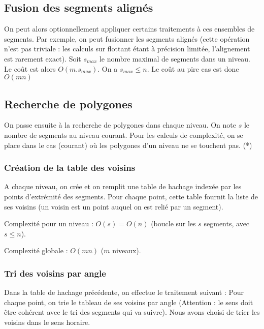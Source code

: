\documentclass{article}
\begin{document}

\subsection{Fusion des segments alignés}

On peut alors optionnellement appliquer certains traitements à ces ensembles de segments. Par exemple, on peut fusionner les segments alignés (cette opération n'est pas triviale : les calculs sur flottant étant à précision limitée, l'alignement est rarement exact). Soit $s_{max}$ le nombre maximal de segments dans un niveau. Le coût est alors $O(m.s_{max})$. On a $s_{max} \leq n$. Le coût au pire cas est donc $O(mn)$

\subsection{Recherche de polygones}

On passe ensuite à la recherche de polygones dans chaque niveau. On note $s$ le nombre de segments au niveau courant. Pour les calculs de complexité, on se place dans le cas (courant) où les polygones d'un niveau ne se touchent pas. (*)

\subsubsection{Création de la table des voisins}

A chaque niveau, on crée et on remplit une table de hachage indexée par les points d’extrémité des segments. Pour chaque point, cette table fournit la liste de ses voisins (un voisin est un point auquel on est relié par un segment).

Complexité pour un niveau : $O(s) = O(n)$ (boucle sur les $s$ segments, avec $s \leq n$).

Complexité globale : $O(mn)$ ($m$ niveaux).

\subsubsection{Tri des voisins par angle}

Dans la table de hachage précédente, on effectue le traitement suivant :
Pour chaque point, on trie le tableau de ses voisins par angle (Attention : le sens doit être cohérent avec le tri des segments qui va suivre). Nous avons choisi de trier les voisins dans le sens horaire.
\end{document}
